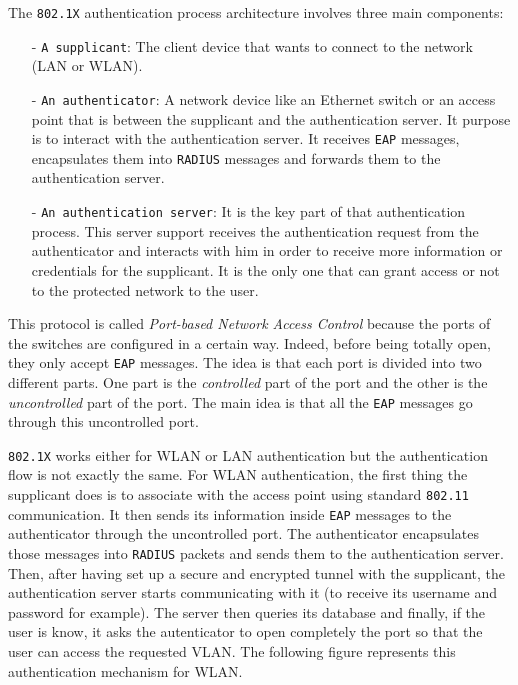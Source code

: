 The \texttt{802.1X} authentication process architecture involves three main components:
\begin{itemize}
	\item[-]\texttt{A supplicant}: The client device that wants to connect to the network (LAN or WLAN).
	\item[-]\texttt{An authenticator}: A network device like an Ethernet switch or an access point that is between the supplicant and the authentication server. It purpose is to interact with the authentication server. It receives \texttt{EAP} messages, encapsulates them into \texttt{RADIUS} messages and forwards them to the authentication server.
	\item[-]\texttt{An authentication server}: It is the key part of that authentication process. This server support receives the authentication request from the authenticator and interacts with him in order to receive more information or credentials for the supplicant. It is the only one that can grant access or not to the protected network to the user.
\end{itemize} 

This protocol is called \textit{Port-based Network Access Control} because the ports of the switches are configured in a certain way. Indeed, before being totally open, they only accept \texttt{EAP} messages. The idea is that each port is divided into two different parts. One part is the \textit{controlled} part of the port and the other is the \textit{uncontrolled} part of the port. The main idea is that all the \texttt{EAP} messages go through this uncontrolled port.

\texttt{802.1X} works either for WLAN or LAN authentication but the authentication flow is not exactly the same.
For WLAN authentication, the first thing the supplicant does is to associate with the access point using standard \texttt{802.11} communication. It then sends its information inside \texttt{EAP} messages to the authenticator through the uncontrolled port. The authenticator encapsulates those messages into \texttt{RADIUS} packets and sends them to the authentication server. Then, after having set up a secure and encrypted tunnel with the supplicant, the authentication server starts communicating with it (to receive its username and password for example). The server then queries its database and finally, if the user is know, it asks the autenticator to open completely the port so that the user can access the requested VLAN.
The following figure represents this authentication mechanism for WLAN.

